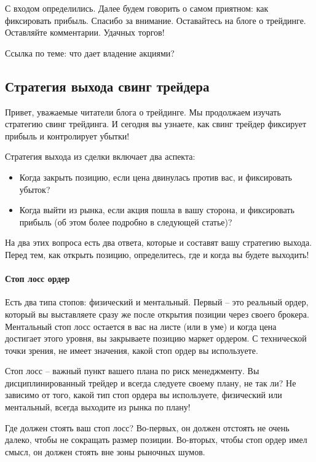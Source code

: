 \documentclass[a5paper]{article}
\begin{document}
С входом определились. Далее будем говорить о самом приятном: как фиксировать прибыль. Спасибо за внимание. Оставайтесь на блоге о трейдинге. Оставляйте комментарии. Удачных торгов!


Ссылка по теме: что дает владение акциями?

\subsection{Стратегия выхода свинг трейдера}

Привет, уважаемые читатели блога о трейдинге. Мы продолжаем изучать стратегию свинг трейдинга. И сегодня вы узнаете, как свинг трейдер фиксирует прибыль и контролирует убытки!

Стратегия выхода из сделки включает два аспекта:
\begin{itemize}
\item     Когда закрыть позицию, если цена двинулась против вас, и фиксировать убыток?
\item     Когда выйти из рынка, если акция пошла в вашу сторона, и фиксировать прибыль (об этом более подробно в следующей статье)?
\end{itemize}

На два этих вопроса есть два ответа, которые и составят вашу стратегию
выхода. Перед тем, как открыть позицию, определитесь, где и когда вы
будете выходить!

\paragraph{Стоп лосс ордер}

Есть два типа стопов: физический и ментальный. Первый – это реальный ордер, который вы выставляете сразу же после открытия позиции через своего брокера. Ментальный стоп лосс остается в вас на листе (или в уме) и когда цена достигает этого уровня, вы закрываете позицию маркет ордером. С технической точки зрения, не имеет значения, какой стоп ордер вы используете.

Стоп лосс – важный пункт вашего плана по риск менеджменту. Вы дисциплинированный трейдер и всегда следуете своему плану, не так ли? Не зависимо от того, какой тип стоп ордера вы используете, физический или ментальный, всегда выходите из рынка по плану!

Где должен стоять ваш стоп лосс? Во-первых, он должен отстоять не очень далеко, чтобы не сокращать размер позиции. Во-вторых, чтобы стоп ордер имел смысл, он должен стоять вне зоны рыночных шумов.
\end{document}
